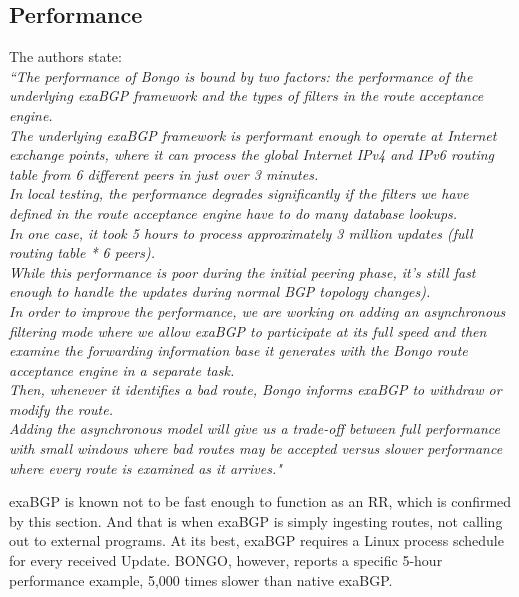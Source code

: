 \subsection{Performance}
The authors state:
\\
\emph{``The performance of Bongo is bound by two factors: the performance of the underlying exaBGP framework and the types of filters in the route acceptance engine.
\\
The underlying exaBGP framework is performant enough to operate at Internet exchange points, where it can process the global Internet IPv4 and IPv6 routing table from 6 different peers in just over 3 minutes.
\\
In local testing, the performance degrades significantly if the filters we have defined in the route acceptance engine have to do many database lookups.
\\
In one case, it took 5 hours to process approximately 3 million updates (full routing table * 6 peers).
\\
While this performance is poor during the initial peering phase, it’s still fast enough to handle the updates during normal BGP topology changes).
\\
In order to improve the performance, we are working on adding an asynchronous filtering mode where we allow exaBGP to participate at its full speed and then examine the forwarding information base it generates with the Bongo route acceptance engine in a separate task.
\\
Then, whenever it identifies a bad route, Bongo informs exaBGP to withdraw or modify the route.
\\
Adding the asynchronous model will give us a trade-off between full performance with small windows where bad routes may be accepted versus slower performance where every route is examined as it arrives."}
    
exaBGP is known not to be fast enough to function as an RR, which is confirmed by this section.  And that is when exaBGP is simply ingesting routes, not calling out to external programs.  At its best, exaBGP requires a Linux process schedule for every received Update.
BONGO, however, reports a specific 5-hour performance example, 5,000 times slower than native exaBGP.
